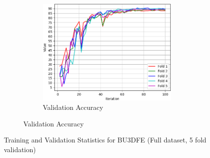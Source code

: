 \begin{figure}[ht]
\begin{subfigure}{\textwidth}
        \begin{subfigure}{0.32\textwidth}
            \includegraphics[width=\linewidth]{Images/training/BU3DFE_7_val_acc.png}
            \caption{Validation Accuracy}
            \label{BU3DFE_7_val_acc}
        \end{subfigure}
    \end{subfigure}
    \caption{Training and Validation Statistics for BU3DFE (Full dataset, 5 fold validation)}
    \label{training_stats2}
\end{figure}





